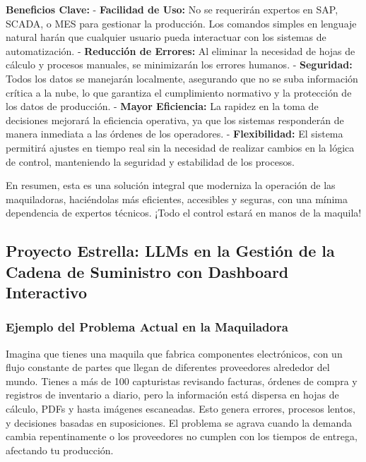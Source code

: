 \documentclass[
  10pt,
  letterpaper,
]{book}
\begin{document}
\textbf{Beneficios Clave:} - \textbf{Facilidad de Uso:} No se requerirán
expertos en SAP, SCADA, o MES para gestionar la producción. Los comandos
simples en lenguaje natural harán que cualquier usuario pueda
interactuar con los sistemas de automatización. - \textbf{Reducción de
Errores:} Al eliminar la necesidad de hojas de cálculo y procesos
manuales, se minimizarán los errores humanos. - \textbf{Seguridad:}
Todos los datos se manejarán localmente, asegurando que no se suba
información crítica a la nube, lo que garantiza el cumplimiento
normativo y la protección de los datos de producción. - \textbf{Mayor
Eficiencia:} La rapidez en la toma de decisiones mejorará la eficiencia
operativa, ya que los sistemas responderán de manera inmediata a las
órdenes de los operadores. - \textbf{Flexibilidad:} El sistema permitirá
ajustes en tiempo real sin la necesidad de realizar cambios en la lógica
de control, manteniendo la seguridad y estabilidad de los procesos.

En resumen, esta es una solución integral que moderniza la operación de
las maquiladoras, haciéndolas más eficientes, accesibles y seguras, con
una mínima dependencia de expertos técnicos. ¡Todo el control estará en
manos de la maquila!

\subsection{\texorpdfstring{Proyecto Estrella: \textbf{LLMs en la
Gestión de la Cadena de Suministro con Dashboard
Interactivo}}{Proyecto Estrella: LLMs en la Gestión de la Cadena de Suministro con Dashboard Interactivo}}\label{proyecto-estrella-llms-en-la-gestiuxf3n-de-la-cadena-de-suministro-con-dashboard-interactivo}

\subsubsection{Ejemplo del Problema Actual en la
Maquiladora}\label{ejemplo-del-problema-actual-en-la-maquiladora}

Imagina que tienes una maquila que fabrica componentes electrónicos, con
un flujo constante de partes que llegan de diferentes proveedores
alrededor del mundo. Tienes a más de 100 capturistas revisando facturas,
órdenes de compra y registros de inventario a diario, pero la
información está dispersa en hojas de cálculo, PDFs y hasta imágenes
escaneadas. Esto genera errores, procesos lentos, y decisiones basadas
en suposiciones. El problema se agrava cuando la demanda cambia
repentinamente o los proveedores no cumplen con los tiempos de entrega,
afectando tu producción.
\end{document}
